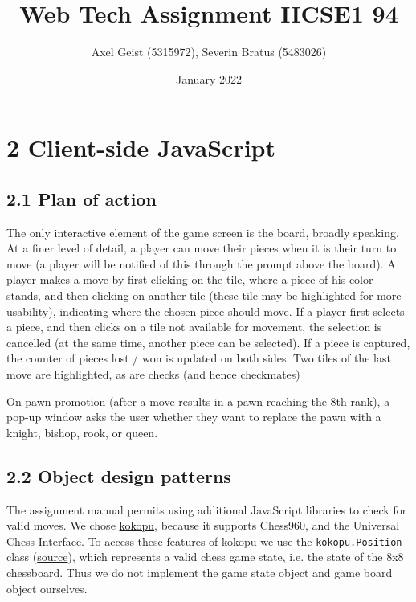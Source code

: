 \documentclass{article}
\title{Web Tech Assignment II\break CSE1 94}
\author{Axel Geist (5315972), Severin Bratus (5483026)}
\date{January 2022}
\begin{document}
\begin{titlepage}
\maketitle
\end{titlepage}

\section*{2 Client-side JavaScript}

\subsection*{2.1 Plan of action}

The only interactive element of the game screen is the board, broadly speaking.
At a finer level of detail, a player can move their pieces when it is their turn to move (a player will be notified of this through the prompt above the board).
A player makes a move by first clicking on the tile, where a piece of his color stands, and then clicking on another tile (these tile may be highlighted for more usability), indicating where the chosen piece should move.
If a player first selects a piece, and then clicks on a tile not available for movement, the selection is cancelled (at the same time, another piece can be selected).
If a piece is captured, the counter of pieces lost / won is updated on both sides.
Two tiles of the last move are highlighted, as are checks (and hence checkmates)

On pawn promotion (after a move results in a pawn reaching the 8th rank), a pop-up window asks the user whether they want to replace the pawn with a knight, bishop, rook, or queen.

\subsection*{2.2 Object design patterns}

The assignment manual permits using additional JavaScript libraries to check for valid moves.
We chose \href{https://www.npmjs.com/package/kokopu}{kokopu}, because it supports Chess960, and the Universal Chess Interface.
To access these features of kokopu we use the \verb|kokopu.Position| class
(\href{https://github.com/yo35/kokopu/blob/master/src/position.js}{source}),
which represents a valid chess game state, i.e. the state of the 8x8 chessboard.
Thus we do not implement the game state object and game board object ourselves.
\end{document}
